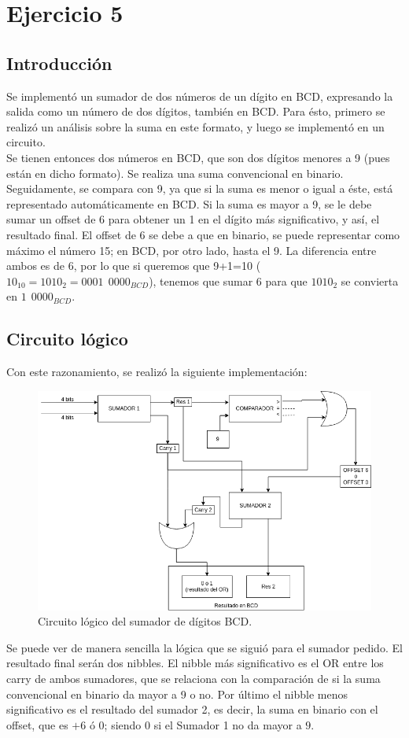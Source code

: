\section{Ejercicio 5}
\subsection{Introducción}

Se implementó un sumador de dos números de un dígito en BCD, expresando la salida como un número de dos dígitos, también en BCD.
Para ésto, primero se realizó un análisis sobre la suma en este formato, y luego se implementó en un circuito.\\
Se tienen entonces dos números en BCD, que son dos dígitos menores a 9 (pues están en dicho formato). Se realiza una suma convencional en binario. Seguidamente, se compara con 9, ya que si la suma es menor o igual a éste, está representado automáticamente en BCD.
Si la suma es mayor a 9, se le debe sumar un offset de 6 para obtener un 1 en el dígito más significativo, y así, el resultado final. 
El offset de 6 se debe a que en binario, se puede representar como máximo el número 15; en BCD, por otro lado, hasta el 9.
La diferencia entre ambos es de 6, por lo que si queremos que 9+1=10 ($10_{10}=1010_2=0001~~0000_{BCD}$), tenemos que sumar 6
para que $1010_2$ se convierta en  $1~~0000_{BCD}$.
\subsection{Circuito lógico}
Con este razonamiento, se realizó la siguiente implementación:
\begin{figure}[H]
    \begin{center}
        \caption{Circuito lógico del sumador de dígitos BCD.}
\includegraphics[scale=0.5]{circuito.png}
    \end{center}
\end{figure}

Se puede ver de manera sencilla la lógica que se siguió para el sumador pedido. El resultado final serán dos nibbles. El nibble más significativo es el OR entre los carry de ambos sumadores, que se relaciona con la comparación de si la suma convencional 
en binario da mayor a 9 o no. Por último el nibble menos significativo es el resultado del sumador 2, es decir, la suma en binario con el offset, que es $+6$ ó $0$; siendo $0$ si el Sumador 1 no da mayor a $9$.